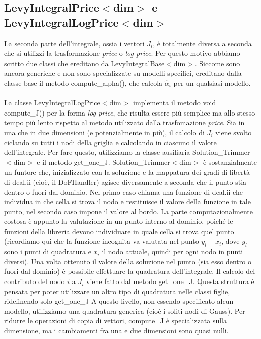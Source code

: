 \documentclass[a4paper,10pt]{report}
\theoremstyle{plain}
\theoremstyle{definition}
\theoremstyle{remark}
\begin{document}
\subsection{\textsf{LevyIntegralPrice$<$dim$>$} e \textsf{LevyIntegralLogPrice$<$dim$>$}}
La seconda parte dell'integrale, ossia i vettori $J_i$, è totalmente diversa a seconda che si utilizzi la trasformazione \emph{price} o \emph{log-price}. Per questo motivo abbiamo scritto due classi che ereditano da \textsf{LevyIntegralBase$<$dim$>$}. Siccome sono ancora generiche e non sono specializzate su modelli specifici, ereditano dalla classe base il metodo \textsf{compute\_alpha()}, che calcola $\hat{\alpha}_i$ per un qualsiasi modello.\\\\La classe \textsf{LevyIntegralLogPrice$<$dim$>$} implementa il metodo \textsf{void compute\_J()} per la forma \emph{log-price}, che risulta essere pi\`u semplice ma allo stesso tempo più lento rispetto al metodo utilizzato dalla trasfomazione \emph{price}. Sia in una che in due dimensioni (e potenzialmente in più), il calcolo di $J_i$ viene svolto ciclando su tutti i nodi della griglia e calcolando in ciascuno il valore dell'integrale. Per fare questo, utilizziamo la classe ausiliaria \textsf{Solution\_Trimmer$<$dim$>$} e il metodo \textsf{get\_one\_J}. \textsf{Solution\_Trimmer$<$dim$>$} è sostanzialmente un funtore che, inizializzato con la soluzione e la mappatura dei gradi di libertà di \textsf{deal.ii} (cio\`e, il \textsf{DoFHandler}) agisce diversamente a seconda che il punto stia dentro o fuori dal dominio. Nel primo caso chiama una funzione di \textsf{deal.ii} che individua in che cella si trova il nodo e restituisce il valore della funzione in tale punto, nel secondo caso impone il valore al bordo. La parte computazionalmente costosa è appunto la valutazione in un punto interno al dominio, poiché le funzioni della libreria devono individuare in quale cella si trova quel punto (ricordiamo qui che la funzione incognita va valutata nel punto $y_l+x_i$, dove $y_l$ sono i punti di quadratura e $x_i$ il nodo attuale, quindi per ogni nodo in punti diversi). Una volta ottenuto il valore della soluzione nel punto (sia esso dentro o fuori dal dominio) è possibile effettuare la quadratura dell'integrale. Il calcolo del contributo del nodo $i$ a $J_i$ viene fatto dal metodo \textsf{get\_one\_J}. Questa struttura è pensata per poter utilizzare un altro tipo di quadratura nelle classi figlie, ridefinendo solo \textsf{get\_one\_J} A questo livello, non essendo specificato alcun modello, utilizziamo una quadratura generica (cio\`e i soliti nodi di Gauss). Per ridurre le operazioni di copia di vettori, \textsf{compute\_J} è specializzata sulla dimensione, ma i cambiamenti fra una e due dimensioni sono quasi nulli.
\end{document}
